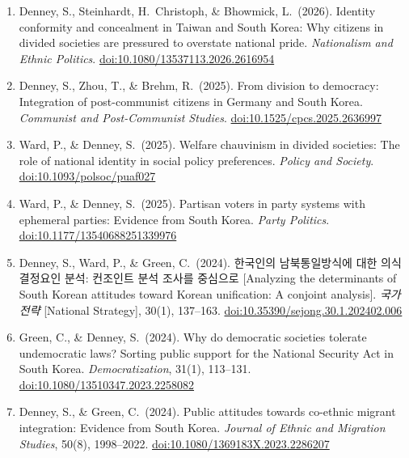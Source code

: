 \documentclass[11pt, a4paper]{article}
\begin{document}
\begin{enumerate}[itemsep=0.15em]\sloppy
  \item Denney, S., Steinhardt, H.\ Christoph, \& Bhowmick, L.\ (2026). Identity conformity and concealment in Taiwan and South Korea: Why citizens in divided societies are pressured to overstate national pride. \textit{Nationalism and Ethnic Politics}. \href{https://doi.org/10.1080/13537113.2026.2616954}{doi:10.1080/13537113.2026.2616954}

  \item Denney, S., Zhou, T., \& Brehm, R.\ (2025). From division to democracy: Integration of post-communist citizens in Germany and South Korea. \textit{Communist and Post-Communist Studies}. \href{https://doi.org/10.1525/cpcs.2025.2636997}{doi:10.1525/cpcs.2025.2636997}

  \item Ward, P., \& Denney, S.\ (2025). Welfare chauvinism in divided societies: The role of national identity in social policy preferences. \textit{Policy and Society}. \href{https://doi.org/10.1093/polsoc/puaf027}{doi:10.1093/polsoc/puaf027}

  \item Ward, P., \& Denney, S.\ (2025). Partisan voters in party systems with ephemeral parties: Evidence from South Korea. \textit{Party Politics}. \href{https://doi.org/10.1177/13540688251339976}{doi:10.1177/13540688251339976}

  \item Denney, S., Ward, P., \& Green, C.\ (2024). 한국인의 남북통일방식에 대한 의식 결정요인 분석: 컨조인트 분석 조사를 중심으로 [Analyzing the determinants of South Korean attitudes toward Korean unification: A conjoint analysis]. \textit{국가전략} [National Strategy], 30(1), 137--163. \href{https://doi.org/10.35390/sejong.30.1.202402.006}{doi:10.35390/sejong.30.1.202402.006}

  \item Green, C., \& Denney, S.\ (2024). Why do democratic societies tolerate undemocratic laws? Sorting public support for the National Security Act in South Korea. \textit{Democratization}, 31(1), 113--131. \href{https://doi.org/10.1080/13510347.2023.2258082}{doi:10.1080/13510347.2023.2258082}

  \item Denney, S., \& Green, C.\ (2024). Public attitudes towards co-ethnic migrant integration: Evidence from South Korea. \textit{Journal of Ethnic and Migration Studies}, 50(8), 1998--2022. \href{https://doi.org/10.1080/1369183X.2023.2286207}{doi:10.1080/1369183X.2023.2286207}


\end{enumerate}
\end{document}
